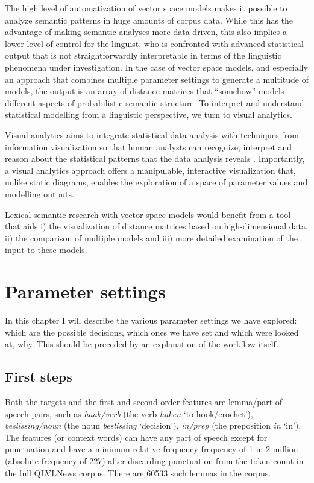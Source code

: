 \documentclass[
]{book}
\begin{document}
The high level of automatization of vector space models makes it possible to analyze semantic patterns in huge amounts of corpus data. While this has the advantage of making semantic analyses more data-driven, this also implies a lower level of control for the linguist, who is confronted with advanced statistical output that is not straightforwardly interpretable in terms of the linguistic phenomena under investigation. In the case of vector space models, and especially an approach that combines multiple parameter settings to generate a multitude of models, the output is an array of distance matrices that ``somehow'' models different aspects of probabilistic semantic structure. To interpret and understand statistical modelling from a linguistic perspective, we turn to visual analytics.

Visual analytics aims to integrate statistical data analysis with techniques from information visualization so that human analysts can recognize, interpret and reason about the statistical patterns that the data analysis reveals \autocite{card.etal_1999}. Importantly, a visual analytics approach offers a manipulable, interactive visualization that, unlike static diagrams, enables the exploration of a space of parameter values and modelling outputs.

Lexical semantic research with vector space models would benefit from a tool that aids
i) the visualization of distance matrices based on high-dimensional data,
ii) the comparison of multiple models and
iii) more detailed examination of the input to these models.

\hypertarget{parameter-settings}{%
\chapter{Parameter settings}\label{parameter-settings}}

In this chapter I will describe the various parameter settings we have explored:
which are the possible decisions, which ones we have set and which were looked at,
why. This should be preceded by an explanation of the workflow itself.

\hypertarget{first-steps}{%
\section{First steps}\label{first-steps}}

Both the targets and the first and second order features are lemma/part-of-speech pairs,
such as \emph{haak/verb} (the verb \emph{haken} `to hook/crochet'),
\emph{beslissing/noun} (the noun \emph{beslissing} `decision'), \emph{in/prep}
(the preposition \emph{in} `in').
The features (or context words) can have any part of speech except for punctuation
and have a minimum relative frequency frequency of 1 in 2 million (absolute frequency of 227)
after discarding punctuation from the token count in the full
QLVLNews corpus. There are 60533 such lemmas in the corpus.
\end{document}
